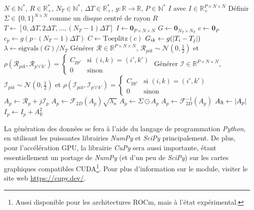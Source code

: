 \documentclass[MSc,french]{ulthese}
\begin{document}
\begin{algorithm}
\caption{Simulation temporelle de tavelures pleinement développées intégrées temporellement}\label{alg:specklesTS_TempInt}
\begin{algorithmic}
\Require $N\in\mathbb{N}^*$, $R\in\mathbb{R}_{+}^*$, $N_T\in\mathbb{N}^*$, $\Delta T\in\mathbb{R}^*_+$, $g: \mathbb{R}\to\mathbb{R}$, $P\in\mathbb{N}^*$
\Ensure $I$ avec $I \in \mathbb{R}_+^{P \times N\times N}$
\State Définir $\Sigma\in\{0,1\}^{N\times N}$ comme un disque centré de rayon $R$
\State $T \gets [0, \Delta T, 2\Delta T, \dots, (N_T - 1)\Delta T]$
\State $I\gets \textbf{0}_{P\times N \times N}$
\State $G\gets \textbf{0}_{N_T \times N_T}$
\State $c \gets \textbf{0}_{P}$
\State $c_p\gets g(p\cdot (N_T-1)\Delta T)$
\EndFor
\State $C \gets \text{Toeplitz}(c)$ 
\State $G_{ik} \gets g(\abs{T_i - T_j})$
\EndFor
\EndFor
\State $\lambda \gets \text{eigvals}(G) / N_T$
\State Générer $\mathcal{R} \in \mathbb{R}^{P \times N \times N}$, $\mathcal{R}_{pik} \sim \mathcal{N}\left(0, \frac{1}{2}\right)$ et $\rho\left(\mathcal{R}_{pik}, \mathcal{R}_{p'i'k'}\right) = \begin{cases}
C_{pp'} & \text{si }(i, k) = (i', k')\\
0 & \text{sinon}
\end{cases}$
\State Générer $\mathcal{I} \in \mathbb{R}^{P\times N\times N}$, $\mathcal{I}_{pik} \sim \mathcal{N}\left(0, \frac{1}{2}\right)$ et $\rho\left(\mathcal{I}_{pik}, \mathcal{I}_{p'i'k'}\right) = \begin{cases}
C_{pp'} & \text{si }(i, k) = (i', k')\\
0 & \text{sinon}
\end{cases}$
\State $A_p \gets \mathcal{R}_p + j\mathcal{I}_p$
\State $A_p \gets \mathcal{F}_{2D}(A_p)\sqrt{\lambda_n}$
\State $A_p\gets \Sigma \odot A_p$
\State $A_p \gets \mathcal{F}^{-1}_{2D}(A_p)$
\State $A_\mathbb{R} \gets \abs{A_p}$
\State $I_p \gets I_p + A_\mathbb{R}^2$
\EndFor
\EndFor
\end{algorithmic}
\end{algorithm}
\newpage
La génération des données se fera à l'aide du langage de programmation \textit{Python}, en utilisant les puissantes librairies \textit{NumPy} et \textit{SciPy} principalement. De plus, pour l'accélération GPU, la librairie \textit{CuPy} sera aussi importante, étant essentiellement un portage de \textit{NumPy} (et d'un peu de \textit{SciPy}) sur les cartes graphiques compatibles CUDA\footnote{Aussi disponible pour les architectures ROCm, mais à l'état expérimental.}. Pour plus d'information sur le module, visiter le site web \url{https://cupy.dev/}.
\end{document}
